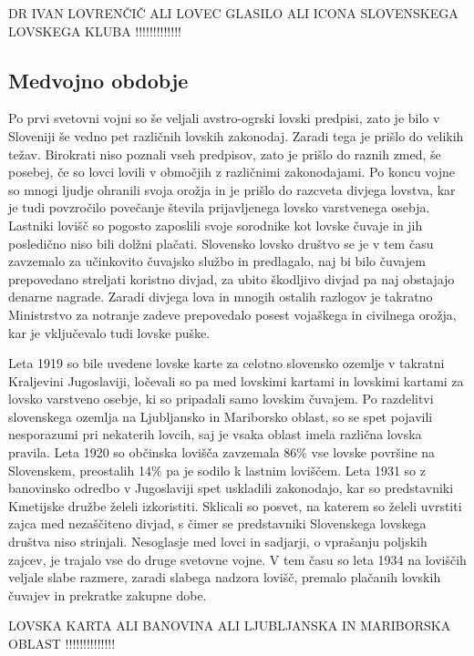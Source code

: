 \documentclass[a4paper,12pt,openright]{book}
\begin{document}
DR IVAN LOVRENČIČ ALI LOVEC GLASILO ALI ICONA SLOVENSKEGA LOVSKEGA KLUBA !!!!!!!!!!!!!

\subsection{Medvojno obdobje}

Po prvi svetovni vojni so še veljali avstro-ogrski lovski predpisi, zato je bilo v Sloveniji še vedno pet različnih lovskih zakonodaj. 
Zaradi tega je prišlo do velikih težav. 
Birokrati niso poznali vseh predpisov, zato je prišlo do raznih zmed, še posebej, če so lovci lovili v območjih z različnimi zakonodajami. 
Po koncu vojne so mnogi ljudje ohranili svoja orožja in je prišlo do razcveta divjega lovstva, kar je tudi povzročilo povečanje števila prijavljenega lovsko varstvenega osebja. Lastniki lovišč so pogosto zaposlili svoje sorodnike kot lovske čuvaje in jih posledično niso bili dolžni plačati. 
Slovensko lovsko društvo se je v tem času zavzemalo za učinkovito čuvajsko službo in predlagalo, naj bi bilo čuvajem prepovedano streljati koristno divjad, za ubito škodljivo divjad pa naj obstajajo denarne nagrade. 
Zaradi divjega lova in mnogih ostalih razlogov je takratno Ministrstvo za notranje zadeve prepovedalo posest vojaškega in civilnega orožja, kar je vključevalo tudi lovske puške.

Leta 1919 so bile uvedene lovske karte za celotno slovensko ozemlje v takratni Kraljevini Jugoslaviji, ločevali so pa med lovskimi kartami in lovskimi kartami za lovsko varstveno osebje, ki so pripadali samo lovskim čuvajem. 
Po razdelitvi slovenskega ozemlja na Ljubljansko in Mariborsko oblast, so se spet pojavili nesporazumi pri nekaterih lovcih, saj je vsaka oblast imela različna lovska pravila. Leta 1920 so občinska lovišča zavzemala 86\% vse lovske površine na Slovenskem, preostalih 14\% pa je sodilo k lastnim loviščem. 
Leta 1931 so z banovinsko odredbo v Jugoslaviji spet uskladili zakonodajo, kar so predstavniki Kmetijske družbe želeli izkoristiti. 
Sklicali so posvet, na katerem so želeli uvrstiti zajca med nezaščiteno divjad, s čimer se predstavniki Slovenskega lovskega društva niso strinjali. 
Nesoglasje med lovci in sadjarji, o vprašanju poljskih zajcev, je trajalo vse do druge svetovne vojne. 
V tem času so leta 1934 na loviščih veljale slabe razmere, zaradi slabega nadzora lovišč, premalo plačanih lovskih čuvajev in prekratke zakupne dobe.

LOVSKA KARTA ALI BANOVINA ALI LJUBLJANSKA IN MARIBORSKA OBLAST !!!!!!!!!!!!!!
\end{document}
